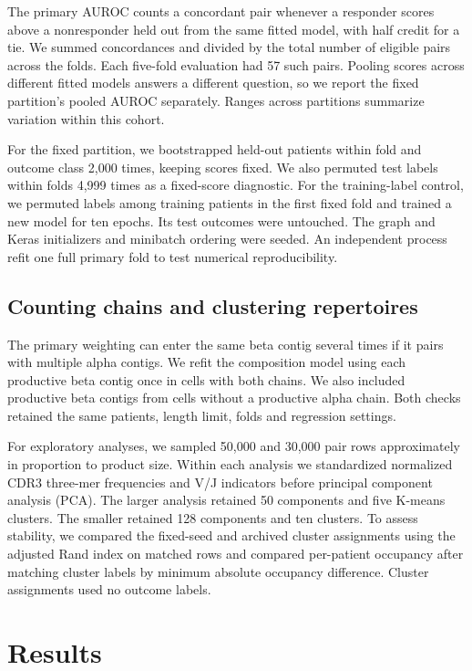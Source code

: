 \documentclass[11pt]{article}
\begin{document}
The primary AUROC counts a concordant pair whenever a responder scores above a nonresponder held out from the same fitted model, with half credit for a tie. We summed concordances and divided by the total number of eligible pairs across the folds. Each five-fold evaluation had 57 such pairs. Pooling scores across different fitted models answers a different question, so we report the fixed partition's pooled AUROC separately. Ranges across partitions summarize variation within this cohort.

For the fixed partition, we bootstrapped held-out patients within fold and outcome class 2,000 times, keeping scores fixed. We also permuted test labels within folds 4,999 times as a fixed-score diagnostic. For the training-label control, we permuted labels among training patients in the first fixed fold and trained a new model for ten epochs. Its test outcomes were untouched. The graph and Keras initializers and minibatch ordering were seeded. An independent process refit one full primary fold to test numerical reproducibility.

\subsection{Counting chains and clustering repertoires}
The primary weighting can enter the same beta contig several times if it pairs with multiple alpha contigs. We refit the composition model using each productive beta contig once in cells with both chains. We also included productive beta contigs from cells without a productive alpha chain. Both checks retained the same patients, length limit, folds and regression settings.

For exploratory analyses, we sampled 50,000 and 30,000 pair rows approximately in proportion to product size. Within each analysis we standardized normalized CDR3 three-mer frequencies and V/J indicators before principal component analysis (PCA). The larger analysis retained 50 components and five K-means clusters. The smaller retained 128 components and ten clusters. To assess stability, we compared the fixed-seed and archived cluster assignments using the adjusted Rand index on matched rows and compared per-patient occupancy after matching cluster labels by minimum absolute occupancy difference. Cluster assignments used no outcome labels.

\FloatBarrier
\section{Results}
\end{document}
